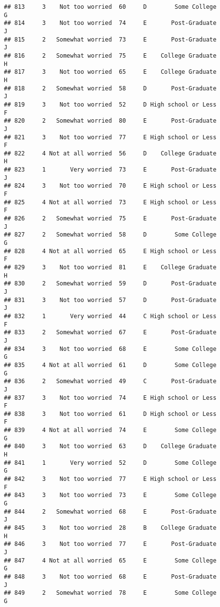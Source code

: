 \documentclass[
]{article}
\begin{document}
\begin{verbatim}
## 813     3    Not too worried  60     D        Some College         G
## 814     3    Not too worried  74     E       Post-Graduate         J
## 815     2   Somewhat worried  73     E       Post-Graduate         J
## 816     2   Somewhat worried  75     E    College Graduate         H
## 817     3    Not too worried  65     E    College Graduate         H
## 818     2   Somewhat worried  58     D       Post-Graduate         J
## 819     3    Not too worried  52     D High school or Less         F
## 820     2   Somewhat worried  80     E       Post-Graduate         J
## 821     3    Not too worried  77     E High school or Less         F
## 822     4 Not at all worried  56     D    College Graduate         H
## 823     1       Very worried  73     E       Post-Graduate         J
## 824     3    Not too worried  70     E High school or Less         F
## 825     4 Not at all worried  73     E High school or Less         F
## 826     2   Somewhat worried  75     E       Post-Graduate         J
## 827     2   Somewhat worried  58     D        Some College         G
## 828     4 Not at all worried  65     E High school or Less         F
## 829     3    Not too worried  81     E    College Graduate         H
## 830     2   Somewhat worried  59     D       Post-Graduate         J
## 831     3    Not too worried  57     D       Post-Graduate         J
## 832     1       Very worried  44     C High school or Less         F
## 833     2   Somewhat worried  67     E       Post-Graduate         J
## 834     3    Not too worried  68     E        Some College         G
## 835     4 Not at all worried  61     D        Some College         G
## 836     2   Somewhat worried  49     C       Post-Graduate         J
## 837     3    Not too worried  74     E High school or Less         F
## 838     3    Not too worried  61     D High school or Less         F
## 839     4 Not at all worried  74     E        Some College         G
## 840     3    Not too worried  63     D    College Graduate         H
## 841     1       Very worried  52     D        Some College         G
## 842     3    Not too worried  77     E High school or Less         F
## 843     3    Not too worried  73     E        Some College         G
## 844     2   Somewhat worried  68     E       Post-Graduate         J
## 845     3    Not too worried  28     B    College Graduate         H
## 846     3    Not too worried  77     E       Post-Graduate         J
## 847     4 Not at all worried  65     E        Some College         G
## 848     3    Not too worried  68     E       Post-Graduate         J
## 849     2   Somewhat worried  78     E        Some College         G

\end{verbatim}
\end{document}
